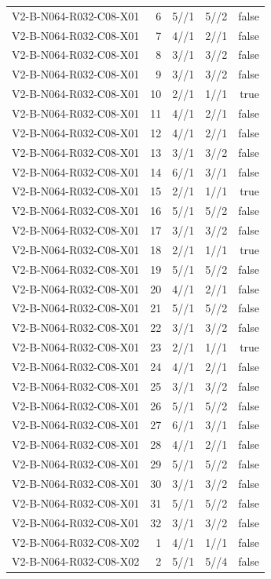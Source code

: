 {\begin{longtable}{lrrrr}
V2-B-N064-R032-C08-X01 & 6 & 5//1 & 5//2 & false \\
V2-B-N064-R032-C08-X01 & 7 & 4//1 & 2//1 & false \\
V2-B-N064-R032-C08-X01 & 8 & 3//1 & 3//2 & false \\
V2-B-N064-R032-C08-X01 & 9 & 3//1 & 3//2 & false \\
V2-B-N064-R032-C08-X01 & 10 & 2//1 & 1//1 & true \\
V2-B-N064-R032-C08-X01 & 11 & 4//1 & 2//1 & false \\
V2-B-N064-R032-C08-X01 & 12 & 4//1 & 2//1 & false \\
V2-B-N064-R032-C08-X01 & 13 & 3//1 & 3//2 & false \\
V2-B-N064-R032-C08-X01 & 14 & 6//1 & 3//1 & false \\
V2-B-N064-R032-C08-X01 & 15 & 2//1 & 1//1 & true \\
V2-B-N064-R032-C08-X01 & 16 & 5//1 & 5//2 & false \\
V2-B-N064-R032-C08-X01 & 17 & 3//1 & 3//2 & false \\
V2-B-N064-R032-C08-X01 & 18 & 2//1 & 1//1 & true \\
V2-B-N064-R032-C08-X01 & 19 & 5//1 & 5//2 & false \\
V2-B-N064-R032-C08-X01 & 20 & 4//1 & 2//1 & false \\
V2-B-N064-R032-C08-X01 & 21 & 5//1 & 5//2 & false \\
V2-B-N064-R032-C08-X01 & 22 & 3//1 & 3//2 & false \\
V2-B-N064-R032-C08-X01 & 23 & 2//1 & 1//1 & true \\
V2-B-N064-R032-C08-X01 & 24 & 4//1 & 2//1 & false \\
V2-B-N064-R032-C08-X01 & 25 & 3//1 & 3//2 & false \\
V2-B-N064-R032-C08-X01 & 26 & 5//1 & 5//2 & false \\
V2-B-N064-R032-C08-X01 & 27 & 6//1 & 3//1 & false \\
V2-B-N064-R032-C08-X01 & 28 & 4//1 & 2//1 & false \\
V2-B-N064-R032-C08-X01 & 29 & 5//1 & 5//2 & false \\
V2-B-N064-R032-C08-X01 & 30 & 3//1 & 3//2 & false \\
V2-B-N064-R032-C08-X01 & 31 & 5//1 & 5//2 & false \\
V2-B-N064-R032-C08-X01 & 32 & 3//1 & 3//2 & false \\
V2-B-N064-R032-C08-X02 & 1 & 4//1 & 1//1 & false \\
V2-B-N064-R032-C08-X02 & 2 & 5//1 & 5//4 & false \\

\end{longtable}}
